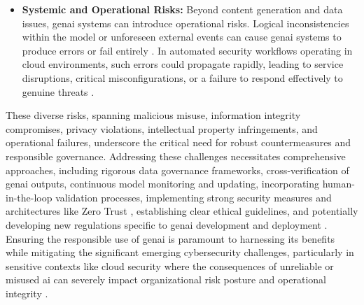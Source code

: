 \begin{itemize}
\item \textbf{Systemic and Operational Risks:} Beyond content generation and data issues, \gls{genai} systems can introduce operational risks. Logical inconsistencies within the model or unforeseen external events can cause \gls{genai} systems to produce errors or fail entirely \cite{surathunmanun_exploring_2024}. In automated security workflows operating in cloud environments, such errors could propagate rapidly, leading to service disruptions, critical misconfigurations, or a failure to respond effectively to genuine threats \cite{surathunmanun_exploring_2024}.
\end{itemize}

These diverse risks, spanning malicious misuse, information integrity compromises, privacy violations, intellectual property infringements, and operational failures, underscore the critical need for robust countermeasures and responsible governance. Addressing these challenges necessitates comprehensive approaches, including rigorous data governance frameworks, cross-verification of \gls{genai} outputs, continuous model monitoring and updating, incorporating human-in-the-loop validation processes, implementing strong security measures \cite{surathunmanun_exploring_2024} and architectures like Zero Trust \cite{surathunmanun_exploring_2024, dash_zero-trust_2024}, establishing clear ethical guidelines, and potentially developing new regulations specific to \gls{genai} development and deployment \cite{nyoto_cyber_2024}. Ensuring the responsible use of \gls{genai} is paramount to harnessing its benefits while mitigating the significant emerging cybersecurity challenges, particularly in sensitive contexts like cloud security where the consequences of unreliable or misused \gls{ai} can severely impact organizational risk posture and operational integrity \cite{surathunmanun_exploring_2024}.
\newpage


